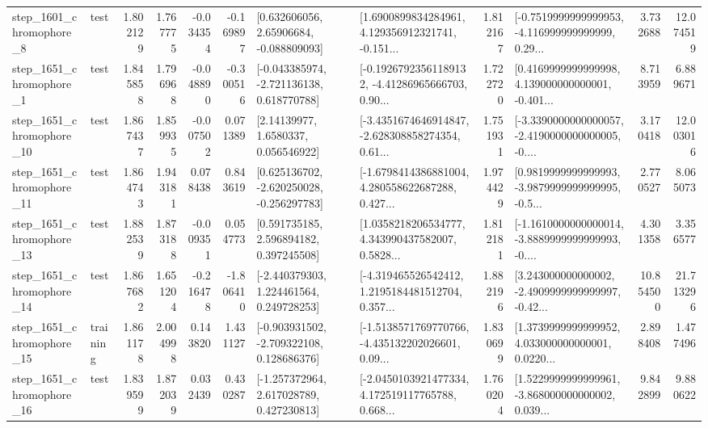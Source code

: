 \begin{tabular}{llrrrrllrlrr}
  step\_1601\_chromophore\_8 &      test &      1.802129 &    1.767775 &     -0.034354 & -0.169897 &     [0.632606056, 2.65906684, -0.088809093] &  [1.6900899834284961, 4.129356912321741, -0.151... &       1.812167 &  [-0.7519999999999953, -4.116999999999999, 0.29... &            3.732688 &         12.074519 \\
  step\_1651\_chromophore\_1 &      test &      1.845858 &    1.796968 &     -0.048890 & -0.300516 &   [-0.043385974, -2.721136138, 0.618770788] &  [-0.19267923561189132, -4.41286965666703, 0.90... &       1.722720 &  [0.4169999999999998, 4.139000000000001, -0.401... &            8.713959 &          6.889671 \\
 step\_1651\_chromophore\_10 &      test &      1.867437 &    1.859935 &     -0.007502 &  0.071389 &        [2.14139977, 1.6580337, 0.056546922] &  [-3.4351674646914847, -2.628308858274354, 0.61... &       1.751931 &  [-3.3390000000000057, -2.4190000000000005, -0.... &            3.170418 &         12.003016 \\
 step\_1651\_chromophore\_11 &      test &      1.864743 &    1.943181 &      0.078438 &  0.843619 &   [0.625136702, -2.620250028, -0.256297783] &  [-1.6798414386881004, 4.280558622687288, 0.427... &       1.974429 &  [0.9819999999999993, -3.9879999999999995, -0.5... &            2.770527 &          8.065073 \\
 step\_1651\_chromophore\_13 &      test &      1.882539 &    1.873188 &     -0.009351 &  0.054773 &     [0.591735185, 2.596894182, 0.397245508] &  [1.0358218206534777, 4.343990437582007, 0.5828... &       1.812181 &  [-1.1610000000000014, -3.8889999999999993, -0.... &            4.301358 &          3.356577 \\
 step\_1651\_chromophore\_14 &      test &      1.867682 &    1.651204 &     -0.216478 & -1.806410 &    [-2.440379303, 1.224461564, 0.249728253] &  [-4.319465526542412, 1.2195184481512704, 0.357... &       1.882196 &  [3.243000000000002, -2.4909999999999997, -0.42... &           10.854500 &         21.713296 \\
 step\_1651\_chromophore\_15 &  training &      1.861178 &    2.004998 &      0.143820 &  1.431127 &   [-0.903931502, -2.709322108, 0.128686376] &  [-1.5138571769770766, -4.435132202026601, 0.09... &       1.830699 &  [1.3739999999999952, 4.033000000000001, 0.0220... &            2.898408 &          1.477496 \\
 step\_1651\_chromophore\_16 &      test &      1.839599 &    1.872039 &      0.032439 &  0.430287 &    [-1.257372964, 2.617028789, 0.427230813] &  [-2.0450103921477334, 4.172519117765788, 0.668... &       1.760204 &  [1.5229999999999961, -3.868000000000002, 0.039... &            9.842899 &          9.880622 \\

\end{tabular}
